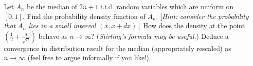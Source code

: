 \documentclass[answers]{exam}
\begin{document}
\begin{questions}



\question%
Let $A_{n}$ be the median of $2 n+1$ i.i.d. random variables which are uniform on $[0,1]$. Find the probability density function of $A_{n}$. [\emph{Hint: consider the probability that $A_{n}$ lies in a small interval $(x, x+d x)$.}] How does the density at the point $\left(\frac{1}{2}+\frac{a}{\sqrt{n}}\right)$ behave as $n \to \infty$? (\emph{Stirling's formula may be useful.}) Deduce a convergence in distribution result for the median (appropriately rescaled) as $n \to \infty$ (feel free to argue informally if you like!).

\end{questions}
\end{document}
